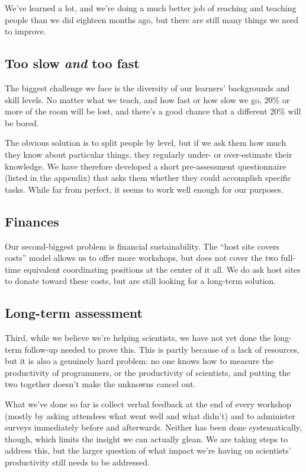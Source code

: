 \documentclass[10pt,a4paper,twocolumn]{article}
\begin{document}
We've learned a lot, and we're doing a much better job of reaching and
teaching people than we did eighteen months ago, but there are still
many things we need to improve.

\subsection*{Too slow \emph{and} too fast}

The biggest challenge we face is the diversity of our learners'
backgrounds and skill levels. No matter what we teach, and how fast or
how slow we go, 20\% or more of the room will be lost, and there's a
good chance that a different 20\% will be bored.

The obvious solution is to split people by level, but if we ask them
how much they know about particular things, they regularly under- or
over-estimate their knowledge.  We have therefore developed a short
pre-assessment questionnaire (listed in the appendix) that asks them
whether they could accomplish specific tasks.  While far from perfect,
it seems to work well enough for our purposes.

\subsection*{Finances}

Our second-biggest problem is financial sustainability. The ``host
site covers costs'' model allows us to offer more workshops, but does
not cover the two full-time equivalent coordinating positions at the
center of it all.  We do ask host sites to donate toward these costs,
but are still looking for a long-term solution.

\subsection*{Long-term assessment}

Third, while we believe we're helping scientists, we have not yet done
the long-term follow-up needed to prove this. This is partly because of
a lack of resources, but it is also a genuinely hard problem: no one
knows how to measure the productivity of programmers, or the
productivity of scientists, and putting the two together doesn't make
the unknowns cancel out.

What we've done so far is collect verbal feedback at the end of every
workshop (mostly by asking attendees what went well and what didn't)
and to administer surveys immediately before and afterwards. Neither
has been done systematically, though, which limits the insight we can
actually glean. We are taking steps to address this, but the larger
question of what impact we're having on scientists' productivity still
needs to be addressed.
\end{document}
